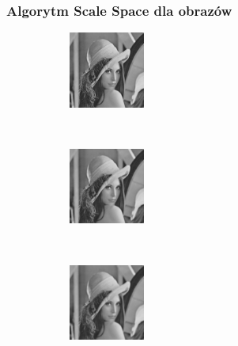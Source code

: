 \begin{frame}
\frametitle{Algorytm Scale Space dla obrazów}


\begin{figure}[h]
\begin{center}
\begin{subfigure}[b]{2.5cm}
                 \centering
                 \includegraphics[width=2.5cm]{Lena_scales1.jpg}
         \end{subfigure}%
		 ~
\begin{subfigure}[b]{2.5cm}
                 \centering
                 \includegraphics[width=2.5cm]{Lena_scales2.jpg}
         \end{subfigure}%
		 ~
\begin{subfigure}[b]{2.5cm}
                 \centering
                 \includegraphics[width=2.5cm]{Lena_scales3.jpg}
         \end{subfigure}%
		 

\end{center}
\end{figure}
\end{frame}
